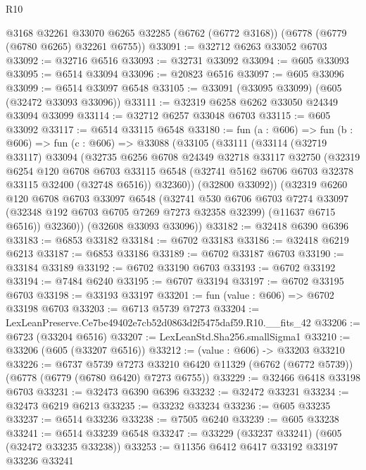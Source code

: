 \begin{lexlean}{R10}
\begin{coremodule}
    @3168
    @32261
    @33070
    @6265
    @32285
    (@6762 (@6772 @3168))
    (@6778 (@6779 (@6780 @6265) @32261 @6755))
@33091 := @32712 @6263 @33052 @6703
@33092 := @32716 @6516
@33093 := @32731 @33092
@33094 := @605 @33093
@33095 := @6514 @33094
@33096 := @20823 @6516
@33097 := @605 @33096
@33099 := @6514 @33097 @6548
@33105 := @33091 (@33095 @33099) (@605 (@32472 @33093 @33096))
@33111 := @32319 @6258 @6262 @33050 @24349 @33094 @33099
@33114 := @32712 @6257 @33048 @6703
@33115 := @605 @33092
@33117 := @6514 @33115 @6548
@33180 := fun (a : @606) =>
  fun (b : @606) =>
  fun (c : @606) =>
  @33088
    (@33105
      (@33111
        (@33114
          (@32719 @33117)
          @33094
          (@32735
            @6256
            @6708
            @24349
            @32718
            @33117
            @32750
            (@32319
              @6254
              @120
              @6708
              @6703
              @33115
              @6548
              (@32741 @5162 @6706 @6703 @32378 @33115 @32400 (@32748 @6516))
              @32360))
          (@32800 @33092))
        (@32319
          @6260
          @120
          @6708
          @6703
          @33097
          @6548
          (@32741
            @530
            @6706
            @6703
            @7274
            @33097
            (@32348 @192 @6703 @6705 @7269 @7273 @32358 @32399)
            (@11637 @6715 @6516))
          @32360))
      (@32608 @33093 @33096))
@33182 := @32418 @6390 @6396
@33183 := @6853 @33182
@33184 := @6702 @33183
@33186 := @32418 @6219 @6213
@33187 := @6853 @33186
@33189 := @6702 @33187 @6703
@33190 := @33184 @33189
@33192 := @6702 @33190 @6703
@33193 := @6702 @33192
@33194 := @7484 @6240
@33195 := @6707 @33194
@33197 := @6702 @33195 @6703
@33198 := @33193 @33197
@33201 := fun (value : @606) => @6702 @33198 @6703
@33203 := @6713 @5739 @7273
@33204 := LexLeanPreserve.Ce7be49402e7cb52d0863d2f5475daf59.R10.__fits_42
@33206 := @6723 (@33204 @6516)
@33207 := LexLeanStd.Sha256.smallSigma1
@33210 := @33206 (@605 (@33207 @6516))
@33212 := (value : @606) -> @33203 @33210
@33226 := @6737
    @5739
    @7273
    @33210
    @6420
    @11329
    (@6762 (@6772 @5739))
    (@6778 (@6779 (@6780 @6420) @7273 @6755))
@33229 := @32466 @6418 @33198 @6703
@33231 := @32473 @6390 @6396
@33232 := @32472 @33231
@33234 := @32473 @6219 @6213
@33235 := @33232 @33234
@33236 := @605 @33235
@33237 := @6514 @33236
@33238 := @7505 @6240
@33239 := @605 @33238
@33241 := @6514 @33239 @6548
@33247 := @33229 (@33237 @33241) (@605 (@32472 @33235 @33238))
@33253 := @11356 @6412 @6417 @33192 @33197 @33236 @33241

\end{coremodule}
\end{lexlean}
